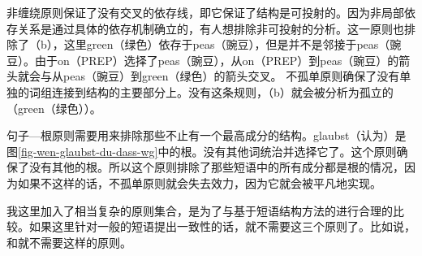\largerpage
\noindent
非缠绕原则保证了没有交叉的依存线，即它保证了结构是可投射的\citep[]{Hudson2000a}。因为非局部依存关系是通过具体的依存机制确立的，有人想排除非可投射的分析。这一原则也排除了（b），这里green（绿色）依存于peas（豌豆），但是并不是邻接于peas（豌豆）。由于on（PREP）选择了peas（豌豆），从on（PREP）到peas（豌豆）的箭头就会与从peas（豌豆）到green（绿色）的箭头交叉。
\eal
{}
\zl
不孤单原则确保了没有单独的词组连接到结构的主要部分上。没有这条规则，（b）就会被分析为孤立的（green（绿色））\citep[]{Hudson2000a}。

句子—根原则需要用来排除那些不止有一个最高成分的结构。glaubst（认为）是图\ref{fig-wen-glaubst-du-dass-wg}中的根。没有其他词统治并选择它了。这个原则确保了没有其他的根。所以这个原则排除了那些短语中的所有成分都是根的情况，因为如果不这样的话，不孤单原则就会失去效力，因为它就会被平凡地实现\citep[]{Hudson2000a}。

我这里加入了相当复杂的原则集合，是为了与基于短语结构方法的进行合理的比较。如果这里针对一般的短语提出一致性的话，就不需要这三个原则了。比如说，\lfgc 和\hpsgc 就不需要这样的原则。

